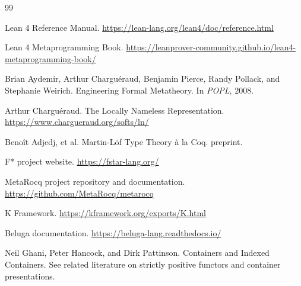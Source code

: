 \documentclass[11pt]{article}
\begin{document}
\begin{thebibliography}{99}

Lean 4 Reference Manual.
\newblock \url{https://lean-lang.org/lean4/doc/reference.html}

Lean 4 Metaprogramming Book.
\newblock \url{https://leanprover-community.github.io/lean4-metaprogramming-book/}

Brian Aydemir, Arthur Chargu\'eraud, Benjamin Pierce, Randy Pollack, and Stephanie Weirich.
\newblock Engineering Formal Metatheory.
\newblock In \emph{POPL}, 2008.

Arthur Chargu\'eraud.
\newblock The Locally Nameless Representation.
\newblock \url{https://www.chargueraud.org/softs/ln/}

Beno\^it Adjedj, et al.
\newblock Martin-L\"of Type Theory \`a la Coq.
 preprint.

F* project website.
\newblock \url{https://fstar-lang.org/}

MetaRocq project repository and documentation.
\newblock \url{https://github.com/MetaRocq/metarocq}

K Framework.
\newblock \url{https://kframework.org/exports/K.html}

Beluga documentation.
\newblock \url{https://beluga-lang.readthedocs.io/}

Neil Ghani, Peter Hancock, and Dirk Pattinson.
\newblock Containers and Indexed Containers.
\newblock See related literature on strictly positive functors and container presentations.

\end{thebibliography}
\end{document}

